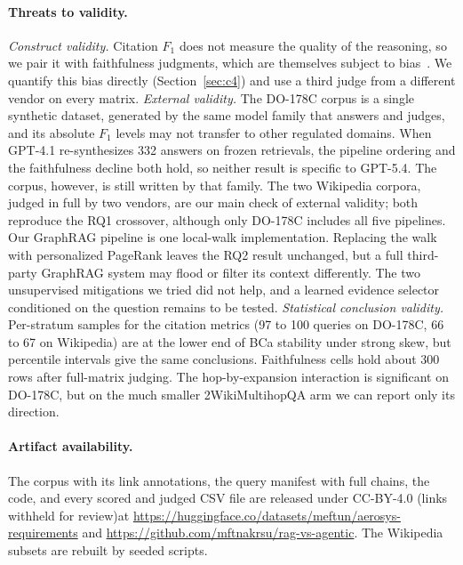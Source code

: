 \paragraph{Threats to validity.}
\emph{Construct validity.} Citation $F_1$ does not measure the quality
of the reasoning, so we pair it with faithfulness judgments, which are
themselves subject to bias~\cite{selfpref_bias2024,wallat2024}. We
quantify this bias directly (Section~\ref{sec:c4}) and use a third
judge from a different vendor on every matrix.
\emph{External validity.} The DO-178C corpus is a single synthetic
dataset, generated by the same model family that answers and judges,
and its absolute $F_1$ levels may not transfer to other regulated
domains. When GPT-4.1 re-synthesizes 332 answers on frozen retrievals, the
pipeline ordering and the faithfulness decline both hold, so neither
result is specific to GPT-5.4. The corpus, however, is still written by that family. The two Wikipedia
corpora, judged in full by two vendors, are our main check of external
validity; both reproduce the RQ1 crossover, although only DO-178C
includes all five pipelines. Our GraphRAG pipeline is one
local-walk implementation. Replacing the walk with personalized
PageRank leaves the RQ2 result unchanged, but a full third-party
GraphRAG system may flood or filter its context differently. The two
unsupervised mitigations we tried did not help, and a learned evidence
selector conditioned on the question remains to be tested.
\emph{Statistical conclusion validity.} Per-stratum samples for the citation metrics (97 to 100 queries on
DO-178C, 66 to 67 on Wikipedia) are at the lower end of BCa stability
under strong skew, but percentile intervals give the same conclusions. Faithfulness cells hold about 300 rows after full-matrix judging. The
hop-by-expansion interaction is significant on DO-178C, but on the much
smaller 2WikiMultihopQA arm we can report only its direction.

\paragraph{Artifact availability.}
The corpus with its link annotations, the query manifest with full
chains, the code, and every scored and judged CSV file are released
under CC-BY-4.0 \ifanonymous (links withheld for review)\else at
\url{https://huggingface.co/datasets/meftun/aerosys-requirements} and
\url{https://github.com/mftnakrsu/rag-vs-agentic}\fi. The Wikipedia
subsets are rebuilt by seeded scripts.
